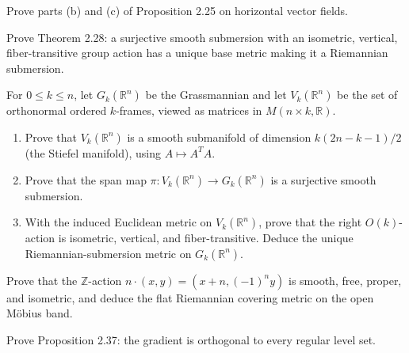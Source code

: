 \begin{exercise}\label{prob:horizontal-vector-fields}
\leanok
{}
Prove parts (b) and (c) of Proposition 2.25 on horizontal vector fields.
\end{exercise}

\begin{exercise}
\label{prob:riemannian-metric-submersion}
\leanok
{}
Prove Theorem 2.28: a surjective smooth submersion with an isometric, vertical, fiber-transitive group action has a unique base metric making it a Riemannian submersion.
\end{exercise}

\begin{exercise}\label{prob:grassmann-stiefel-manifolds}
For $0\le k\le n$, let $G_k(\mathbb R^n)$ be the Grassmannian and let $V_k(\mathbb R^n)$ be the set of orthonormal ordered $k$-frames, viewed as matrices in $M(n\times k,\mathbb R)$.
\begin{enumerate}
\item[(a)] Prove that $V_k(\mathbb R^n)$ is a smooth submanifold of dimension $k(2n-k-1)/2$ (the Stiefel manifold), using $A\mapsto A^TA$.
\item[(b)] Prove that the span map $\pi:V_k(\mathbb R^n)\to G_k(\mathbb R^n)$ is a surjective smooth submersion.
\item[(c)] With the induced Euclidean metric on $V_k(\mathbb R^n)$, prove that the right $O(k)$-action is isometric, vertical, and fiber-transitive. Deduce the unique Riemannian-submersion metric on $G_k(\mathbb R^n)$.
\end{enumerate}
\end{exercise}

\begin{exercise}\label{prob:mobius-band-metric}
Prove that the $\mathbb Z$-action $n\cdot(x,y)=(x+n,(-1)^ny)$ is smooth, free, proper, and isometric, and deduce the flat Riemannian covering metric on the open Möbius band.
\end{exercise}

\begin{exercise}
\label{prob:gradient-orthogonal-level-sets}
\leanok
{}
Prove Proposition 2.37: the gradient is orthogonal to every regular level set.
\end{exercise}

